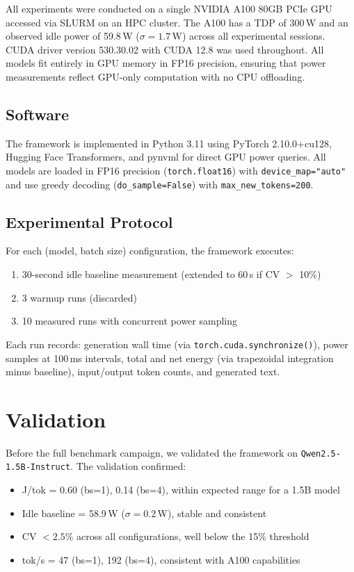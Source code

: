 \documentclass[conference]{IEEEtran}
\begin{document}
All experiments were conducted on a single NVIDIA A100 80GB PCIe GPU accessed via SLURM on an HPC cluster. The A100 has a TDP of 300\,W and an observed idle power of 59.8\,W ($\sigma = 1.7$\,W) across all experimental sessions. CUDA driver version 530.30.02 with CUDA 12.8 was used throughout. All models fit entirely in GPU memory in FP16 precision, ensuring that power measurements reflect GPU-only computation with no CPU offloading.

\subsection{Software}

The framework is implemented in Python 3.11 using PyTorch 2.10.0+cu128, Hugging Face Transformers, and pynvml for direct GPU power queries. All models are loaded in FP16 precision (\texttt{torch.float16}) with \texttt{device\_map="auto"} and use greedy decoding (\texttt{do\_sample=False}) with \texttt{max\_new\_tokens=200}.

\subsection{Experimental Protocol}

For each (model, batch size) configuration, the framework executes:
\begin{enumerate}
    \item 30-second idle baseline measurement (extended to 60\,s if CV $>$ 10\%)
    \item 3 warmup runs (discarded)
    \item 10 measured runs with concurrent power sampling
\end{enumerate}

Each run records: generation wall time (via \texttt{torch.cuda.synchronize()}), power samples at 100\,ms intervals, total and net energy (via trapezoidal integration minus baseline), input/output token counts, and generated text.

\section{Validation}

Before the full benchmark campaign, we validated the framework on \texttt{Qwen2.5-1.5B-Instruct}. The validation confirmed:
\begin{itemize}
    \item J/tok = 0.60 (bs=1), 0.14 (bs=4), within expected range for a 1.5B model
    \item Idle baseline = 58.9\,W ($\sigma = 0.2$\,W), stable and consistent
    \item CV $< 2.5$\% across all configurations, well below the 15\% threshold
    \item tok/s = 47 (bs=1), 192 (bs=4), consistent with A100 capabilities
\end{itemize}
\end{document}
